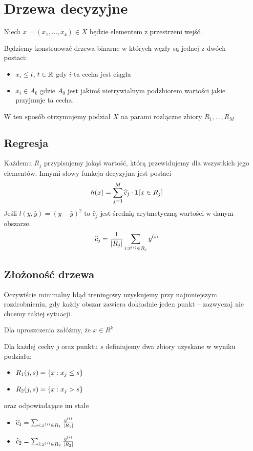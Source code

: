 \section{Drzewa decyzyjne}

Niech \( x = (x_1, \dots, x_k) \in X \) będzie elementem z przestrzeni wejść.

Będziemy konstruować drzewa binarne w których węzły są jednej z dwóch postaci:
\begin{itemize}
    \item \( x_i \leq t \), \(t \in \mathbb{R}\) gdy \(i\)-ta cecha jest ciągła
    \item \( x_i \in A_0 \) gdzie \( A_0 \) jest jakimś nietrywialnym podzbiorem wartości jakie przyjmuje ta cecha.
\end{itemize}

W ten sposób otrzymujemy podział \( X \) na parami rozłączne zbiory \( R_1, \dots, R_M \)

\subsection{Regresja}

Każdemu \( R_j \) przypisujemy jakąś wartość, którą przewidujemy dla wszystkich jego elementów.
Innymi słowy funkcja decyzyjna jest postaci
\[
    h(x) = \sum_{j = 1}^M \widehat c_j \cdot \indicator{x \in R_j}
\]
Jeśli \( l(y, \widehat y) = (y - \widehat y)^2 \)
to \( \widehat c_j \) jest średnią arytmetyczną wartości w danym obszarze.
\[
    \widehat c_j = \frac{1}{\card{R_j}} \sum_{i : x^{(i)} \in R_j} y^{(i)}
\]

\subsection{Złożoność drzewa}
Oczywiście minimalny błąd treningowy uzyskujemy przy najmniejszym rozdrobnieniu, gdy każdy obszar zawiera dokładnie jeden punkt -- zazwyczaj nie chcemy takiej sytuacji.

Dla uproszczenia załóżmy, że \( x \in R^k \)

Dla każdej cechy \( j \) oraz punktu \( s \) definiujemy dwa zbiory uzyskane w wyniku podziału:
\begin{itemize}
    \item \( R_1(j, s) = \set{x : x_j \leq s} \)
    \item \( R_2(j, s) = \set{x : x_j > s} \)
\end{itemize}
oraz odpowiadające im stałe
\begin{itemize}
    \item \( \widehat c_1 = \sum_{i : x^{(i)} \in R_1} \frac{y^{(i)}}{\card{R_1}} \)
    \item \( \widehat c_2 = \sum_{i : x^{(i)} \in R_2} \frac{y^{(i)}}{\card{R_2}} \)
\end{itemize}

